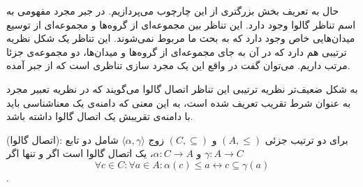 حال به تعریف بخش بزرگتری از این چارچوب می‌پردازیم. در جبر مجرد مفهومی به اسم تناظر گالوا وجود دارد. این تناظر بین مجموعه‌ای از گروه‌ها و مجموعه‌ای از توسیع میدان‌هایی خاص وجود دارد که به بحث ما مربوط نمی‌شوند. این تناظر یک شکل نظریه ترتیبی هم دارد که در آن به جای مجموعه‌ای از گروه‌ها و میدان‌ها، دو مجموعه‌ی جزئا مرتب داریم. می‌توان گفت در واقع این یک مجرد سازی تناظری است که از جبر آمده. 

به شکل ضعیف‌تر نظریه ترتیبی این تناظر اتصال گالوا می‌گویند که در نظریه تعبیر مجرد به عنوان شرط تقریب تعریف شده است، به این معنی که دامنه‌ی یک معناشناسی باید با دامنه‌ی تقریبش یک اتصال گالوا داشته باشد.

\begin{defn}
	(اتصال گالوا): برای دو ترتیب جزئی
	$(A,\leq)$ 
	و
	$(C,\subseteq)$
	زوج 
	$\langle \alpha , \gamma \rangle$
	شامل دو تابع
	$\gamma:A \rightarrow C$
	و
	$\alpha:C \rightarrow A$،
	 یک اتصال گالوا است اگر و تنها اگر
	$$\forall c \in C :\forall a \in A: \alpha(c)\leq a \leftrightarrow c \subseteq \gamma(a)$$.
\end{defn}







